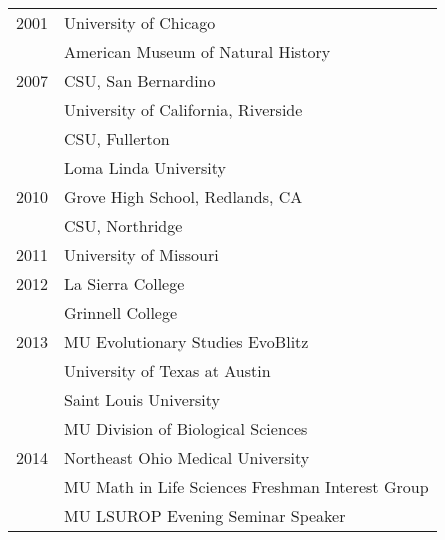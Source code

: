 \begin{longtable}{@{}lX@{}}
	2001 & University of Chicago\\
    & American Museum of Natural History\\
	2007 & CSU, San Bernardino\\
    & University of California, Riverside\\
    & CSU, Fullerton\\
    & Loma Linda University\\
    2010 & Grove High School, Redlands, CA\\
    & CSU, Northridge\\
    2011 & University of Missouri\\
    2012 & La Sierra College\\
    & Grinnell College\\
    2013 & MU Evolutionary Studies EvoBlitz\\
    & University of Texas at Austin\\
    & Saint Louis University\\
    & MU Division of Biological Sciences\\
    2014 & Northeast Ohio Medical University\\
    & MU Math in Life Sciences Freshman Interest Group\\
    & MU LSUROP Evening Seminar Speaker\\
\end{longtable}
